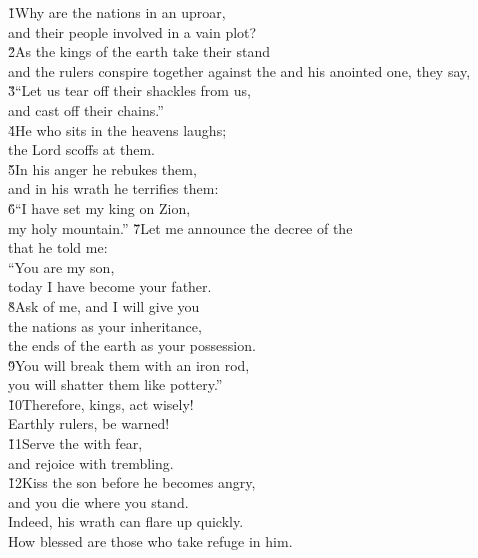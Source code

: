 \begin{poetry}
\poeml \v{1}Why are the nations in an uproar, \\
\poemll    and their people involved in a vain plot? \\
\poeml \v{2}As the kings of the earth take their stand \\
\poemll    and the rulers conspire together against the  and his anointed one, they say, \\
\poeml \v{3}``Let us tear off their shackles from us, \\
\poemll    and cast off their chains.'' \\
\poeml \v{4}He who sits in the heavens laughs; \\
\poemll    the Lord scoffs at them. \\
\poeml \v{5}In his anger he rebukes them, \\
\poemll    and in his wrath he terrifies them: \\
\poeml \v{6}``I have set my king on Zion, \\
\poemll    my holy mountain.''
\poeml \v{7}Let me announce the decree of the  \\
\poemll    that he told me: \\
\poeml ``You are my son, \\
\poemll    today I have become your father. \\
\poeml \v{8}Ask of me, and I will give you \\
\poemll    the nations as your inheritance, \\
\poemlll       the ends of the earth as your possession. \\
\poeml \v{9}You will break them with an iron rod, \\
\poemll    you will shatter them like pottery.'' \\
\poeml \v{10}Therefore, kings, act wisely! \\
\poemll    Earthly rulers, be warned! \\
\poeml \v{11}Serve the  with fear, \\
\poemll    and rejoice with trembling. \\
\poeml \v{12}Kiss the son before he becomes angry, \\
\poemll    and you die where you stand. \\
\poeml Indeed, his wrath can flare up quickly. \\
\poeml How blessed are those who take refuge in him.
\end{poetry}

